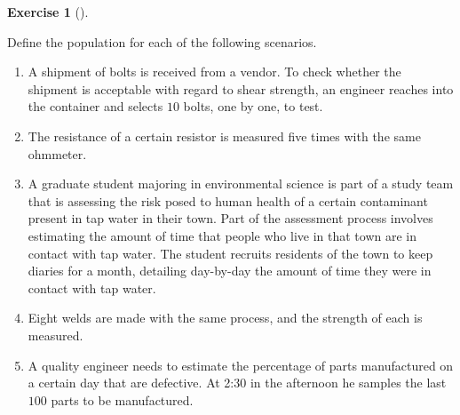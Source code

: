 \documentclass[
  letterpaper,
  DIV=11,
  numbers=noendperiod]{scrreprt}
\providecommand{\tightlist}{%
  \setlength{\itemsep}{0pt}\setlength{\parskip}{0pt}}\usepackage{longtable,booktabs,array}
\theoremstyle{definition}
\newtheorem{exercise}{Exercise}[chapter]
\theoremstyle{definition}
\theoremstyle{definition}
\theoremstyle{remark}
\begin{document}
\begin{exercise}[]\protect\hypertarget{exr-10.2}{}\label{exr-10.2}

Define the population for each of the following scenarios.

\begin{enumerate}
\def\labelenumi{\alph{enumi}.}
\tightlist
\item
  A shipment of bolts is received from a vendor. To check whether the
  shipment is acceptable with regard to shear strength, an engineer
  reaches into the container and selects \(10\) bolts, one by one, to
  test.
\item
  The resistance of a certain resistor is measured five times with the
  same ohmmeter.
\item
  A graduate student majoring in environmental science is part of a
  study team that is assessing the risk posed to human health of a
  certain contaminant present in tap water in their town. Part of the
  assessment process involves estimating the amount of time that people
  who live in that town are in contact with tap water. The student
  recruits residents of the town to keep diaries for a month, detailing
  day-by-day the amount of time they were in contact with tap water.
\item
  Eight welds are made with the same process, and the strength of each
  is measured.
\item
  A quality engineer needs to estimate the percentage of parts
  manufactured on a certain day that are defective. At 2:30 in the
  afternoon he samples the last \(100\) parts to be manufactured.
\end{enumerate}

\end{exercise}
\end{document}
